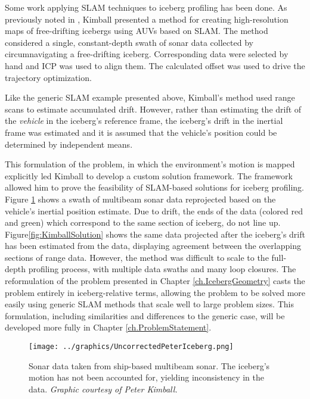Some work applying SLAM techniques to iceberg profiling has been done. As previously noted in \cite{Kimball2011b}, Kimball presented a method for creating high-resolution maps of free-drifting icebergs using AUVs based on SLAM. The method considered a single, constant-depth swath of sonar data collected by circumnavigating a free-drifting iceberg. Corresponding data were selected by hand and ICP was used to align them. The calculated offset was used to drive the trajectory optimization.

Like the generic SLAM example presented above, Kimball's method used range scans to estimate accumulated drift. However, rather than estimating the drift of the \emph{vehicle} in the iceberg's reference frame, the iceberg's drift in the inertial frame was estimated and it is assumed that the vehicle's position could be determined by independent means.  

This formulation of the problem, in which the environment's motion is mapped explicitly led Kimball to develop a custom solution framework. The framework allowed him to prove the feasibility of SLAM-based solutions for iceberg profiling. Figure \ref{fig:KimballPreSolution} shows a swath of multibeam sonar data reprojected based on the vehicle's inertial position estimate. Due to drift, the ends of the data (colored red and green) which correspond to the same section of iceberg, do not line up. Figure\ref{fig:KimballSolution} shows the same data projected after the iceberg's drift has been estimated from the data, displaying agreement between the overlapping sections of range data. However, the method was difficult to scale to the full-depth profiling process, with multiple data swaths and many loop closures. The reformulation of the problem presented in Chapter \ref{ch.IcebergGeometry} casts the problem entirely in iceberg-relative terms, allowing the problem to be solved more easily using generic SLAM methods that scale well to large problem sizes. This formulation, including similarities and differences to the generic case, will be developed more fully in Chapter \ref{ch.ProblemStatement}.

 \begin{figure}[!htb]
   \centering
   \texttt{[image: ../graphics/UncorrectedPeterIceberg.png]} %
   \caption{Sonar data taken from ship-based multibeam sonar. The iceberg's motion has not been accounted for, yielding inconsistency in the data. \emph{Graphic courtesy of Peter Kimball.}}
   \label{fig:KimballPreSolution}
\end{figure}

